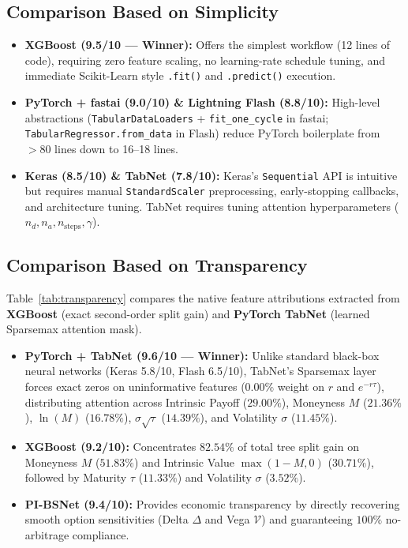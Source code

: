 \documentclass[10pt,twocolumn]{article}
\begin{document}
\subsection{Comparison Based on Simplicity}
\begin{itemize}
    \item \textbf{XGBoost (9.5/10 --- Winner):} Offers the simplest workflow (12 lines of code), requiring zero feature scaling, no learning-rate schedule tuning, and immediate Scikit-Learn style \texttt{.fit()} and \texttt{.predict()} execution.
    \item \textbf{PyTorch + fastai (9.0/10) \& Lightning Flash (8.8/10):} High-level abstractions (\texttt{TabularDataLoaders} + \texttt{fit\_one\_cycle} in fastai; \texttt{TabularRegressor.from\_data} in Flash) reduce PyTorch boilerplate from $>80$ lines down to 16--18 lines.
    \item \textbf{Keras (8.5/10) \& TabNet (7.8/10):} Keras's \texttt{Sequential} API is intuitive but requires manual \texttt{StandardScaler} preprocessing, early-stopping callbacks, and architecture tuning. TabNet requires tuning attention hyperparameters ($n_d, n_a, n_{\text{steps}}, \gamma$).
\end{itemize}

\subsection{Comparison Based on Transparency}
Table~\ref{tab:transparency} compares the native feature attributions extracted from \textbf{XGBoost} (exact second-order split gain) and \textbf{PyTorch TabNet} (learned Sparsemax attention mask).
\begin{itemize}
    \item \textbf{PyTorch + TabNet (9.6/10 --- Winner):} Unlike standard black-box neural networks (Keras 5.8/10, Flash 6.5/10), TabNet's Sparsemax layer forces exact zeros on uninformative features ($0.00\%$ weight on $r$ and $e^{-r\tau}$), distributing attention across Intrinsic Payoff ($29.00\%$), Moneyness $M$ ($21.36\%$), $\ln(M)$ ($16.78\%$), $\sigma\sqrt{\tau}$ ($14.39\%$), and Volatility $\sigma$ ($11.45\%$).
    \item \textbf{XGBoost (9.2/10):} Concentrates $82.54\%$ of total tree split gain on Moneyness $M$ ($51.83\%$) and Intrinsic Value $\max(1-M,0)$ ($30.71\%$), followed by Maturity $\tau$ ($11.33\%$) and Volatility $\sigma$ ($3.52\%$).
    \item \textbf{PI-BSNet (9.4/10):} Provides economic transparency by directly recovering smooth option sensitivities (Delta $\Delta$ and Vega $\mathcal{V}$) and guaranteeing $100\%$ no-arbitrage compliance.
\end{itemize}
\end{document}
